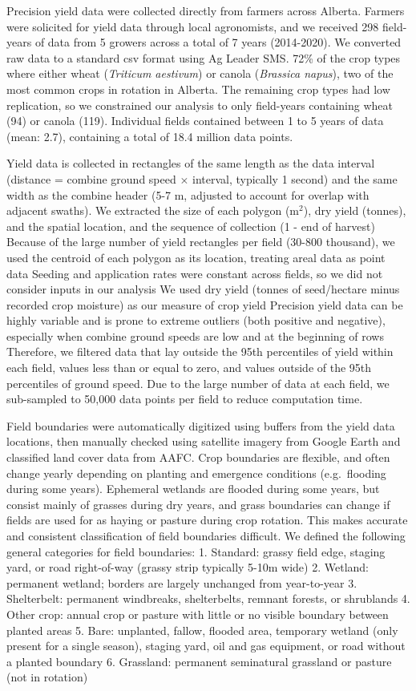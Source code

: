\documentclass[]{elsarticle} %
\begin{document}
Precision yield data were collected directly from farmers across Alberta.
Farmers were solicited for yield data through local agronomists, and we received 298 field-years of data from 5 growers across a total of 7 years (2014-2020).
We converted raw data to a standard csv format using Ag Leader SMS.
72\% of the crop types where either wheat (\emph{Triticum aestivum}) or canola (\emph{Brassica napus}), two of the most common crops in rotation in Alberta.
The remaining crop types had low replication, so we constrained our analysis to only field-years containing wheat (94) or canola (119).
Individual fields contained between 1 to 5 years of data (mean: 2.7), containing a total of 18.4 million data points.

Yield data is collected in rectangles of the same length as the data interval (distance = combine ground speed \(\times\) interval, typically 1 second) and the same width as the combine header (5-7 m, adjusted to account for overlap with adjacent swaths).
We extracted the size of each polygon (m\(^2\)), dry yield (tonnes), and the spatial location, and the sequence of collection (1 - end of harvest)
Because of the large number of yield rectangles per field (30-800 thousand), we used the centroid of each polygon as its location, treating areal data as point data
Seeding and application rates were constant across fields, so we did not consider inputs in our analysis
We used dry yield (tonnes of seed/hectare minus recorded crop moisture) as our measure of crop yield
Precision yield data can be highly variable and is prone to extreme outliers (both positive and negative), especially when combine ground speeds are low and at the beginning of rows
Therefore, we filtered data that lay outside the 95th percentiles of yield within each field, values less than or equal to zero, and values outside of the 95th percentiles of ground speed.
Due to the large number of data at each field, we sub-sampled to 50,000 data points per field to reduce computation time.

Field boundaries were automatically digitized using buffers from the yield data locations, then manually checked using satellite imagery from Google Earth and classified land cover data from AAFC.
Crop boundaries are flexible, and often change yearly depending on planting and emergence conditions (e.g.~flooding during some years).
Ephemeral wetlands are flooded during some years, but consist mainly of grasses during dry years, and grass boundaries can change if fields are used for as haying or pasture during crop rotation.
This makes accurate and consistent classification of field boundaries difficult.
We defined the following general categories for field boundaries:
1. Standard: grassy field edge, staging yard, or road right-of-way (grassy strip typically 5-10m wide)
2. Wetland: permanent wetland; borders are largely unchanged from year-to-year
3. Shelterbelt: permanent windbreaks, shelterbelts, remnant forests, or shrublands
4. Other crop: annual crop or pasture with little or no visible boundary between planted areas
5. Bare: unplanted, fallow, flooded area, temporary wetland (only present for a single season), staging yard, oil and gas equipment, or road without a planted boundary
6. Grassland: permanent seminatural grassland or pasture (not in rotation)
\end{document}
